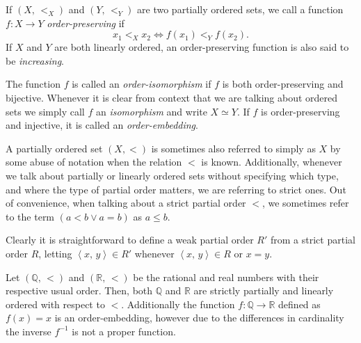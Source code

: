 \documentclass[../../main.tex]{subfiles}
\begin{document}
\begin{definition}\cite[p.13]{Jec78}
    If $\left(X,\, <_X\right)$ and $\left(Y,\, <_Y\right)$ are two partially ordered sets, we call a function $f: X \to Y$ \textit{order-preserving} if
    $$x_1 <_X x_2 \iff f(x_1) <_Y f(x_2).$$
    If $X$ and $Y$ are both linearly ordered, an order-preserving function is also said to be \textit{increasing}.

    The function $f$ is called an \textit{order-isomorphism} if $f$ is both order-preserving and bijective.
    Whenever it is clear from context that we are talking about ordered sets we simply call $f$ an \textit{isomorphism} and write $X \simeq Y$.
    If $f$ is order-preserving and injective, it is called an \textit{order-embedding}. \cite[p.167]{Gol17}
\end{definition}

A partially ordered set $(X, <)$ is sometimes also referred to simply as $X$ by some abuse of notation when the relation $<$ is known.
Additionally, whenever we talk about partially or linearly ordered sets without specifying which type, and where the type of partial order matters, we are referring to strict ones. \cite[p.12]{Jec78}
Out of convenience, when talking about a strict partial order $<$, we sometimes refer to the term $\left(a < b \vee a = b\right)$ as $a \leq b$.

Clearly it is straightforward to define a weak partial order $R'$ from a strict partial order $R$, letting $\left<x,\, y\right> \in R'$ whenever $\left<x,\, y\right> \in R$ or $x = y$.

\begin{example}
        Let $(\mathbb{Q},\, <)$ and $(\mathbb{R},\, <)$ be the rational and real numbers with their respective usual order.
        Then, both $\mathbb{Q}$ and $\mathbb{R}$ are strictly partially and linearly ordered with respect to $<$.
        Additionally the function $f: \mathbb{Q} \to \mathbb{R}$ defined as $f(x) = x$ is an order-embedding, 
        however due to the differences in cardinality the inverse $f^{-1}$ is not a proper function.
\end{example}
\end{document}
